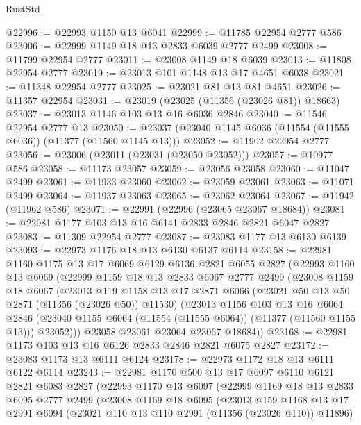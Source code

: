 \begin{lexlean}{RustStd}
\begin{coremodule}
@22996 := @22993 @1150 @13 @6041
@22999 := @11785 @22954 @2777 @586
@23006 := @22999 @1149 @18 @13 @2833 @6039 @2777 @2499
@23008 := @11799 @22954 @2777
@23011 := @23008 @1149 @18 @6039
@23013 := @11808 @22954 @2777
@23019 := @23013 @101 @1148 @13 @17 @4651 @6038
@23021 := @11348 @22954 @2777
@23025 := @23021 @81 @13 @81 @4651
@23026 := @11357 @22954
@23031 := @23019 (@23025 (@11356 (@23026 @81)) @18663)
@23037 := @23013 @1146 @103 @13 @16 @6036 @2846
@23040 := @11546 @22954 @2777 @13
@23050 := @23037 (@23040 @1145 @6036 (@11554 (@11555 @6036)) (@11377 (@11560 @1145 @13)))
@23052 := @11902 @22954 @2777
@23056 := @23006 (@23011 (@23031 (@23050 @23052)))
@23057 := @10977 @586
@23058 := @11173 @23057
@23059 := @23056 @23058
@23060 := @11047 @2499
@23061 := @11933 @23060
@23062 := @23059 @23061
@23063 := @11071 @2499
@23064 := @11937 @23063
@23065 := @23062 @23064
@23067 := @11942 (@11962 @586)
@23071 := @22991 (@22996 (@23065 @23067 @18684))
@23081 := @22981 @1177 @103 @13 @16 @6141 @2833 @2846 @2821 @6047 @2827
@23083 := @11309 @22954 @2777
@23087 := @23083 @1177 @13 @6130 @6139
@23093 := @22973 @1176 @18 @13 @6130 @6137 @6114
@23158 := @22981
    @1160
    @1175
    @13
    @17
    @6069
    @6129
    @6136
    @2821
    @6055
    @2827
    (@22993
      @1160
      @13
      @6069
      (@22999
        @1159
        @18
        @13
        @2833
        @6067
        @2777
        @2499
        (@23008
          @1159
          @18
          @6067
          (@23013
            @119
            @1158
            @13
            @17
            @2871
            @6066
            (@23021 @50 @13 @50 @2871 (@11356 (@23026 @50)) @11530)
            (@23013
              @1156
              @103
              @13
              @16
              @6064
              @2846
              (@23040 @1155 @6064 (@11554 (@11555 @6064)) (@11377 (@11560 @1155 @13)))
              @23052)))
        @23058
        @23061
        @23064
        @23067
        @18684))
@23168 := @22981 @1173 @103 @13 @16 @6126 @2833 @2846 @2821 @6075 @2827
@23172 := @23083 @1173 @13 @6111 @6124
@23178 := @22973 @1172 @18 @13 @6111 @6122 @6114
@23243 := @22981
    @1170
    @500
    @13
    @17
    @6097
    @6110
    @6121
    @2821
    @6083
    @2827
    (@22993
      @1170
      @13
      @6097
      (@22999
        @1169
        @18
        @13
        @2833
        @6095
        @2777
        @2499
        (@23008
          @1169
          @18
          @6095
          (@23013
            @159
            @1168
            @13
            @17
            @2991
            @6094
            (@23021 @110 @13 @110 @2991 (@11356 (@23026 @110)) @11896)

\end{coremodule}
\end{lexlean}
